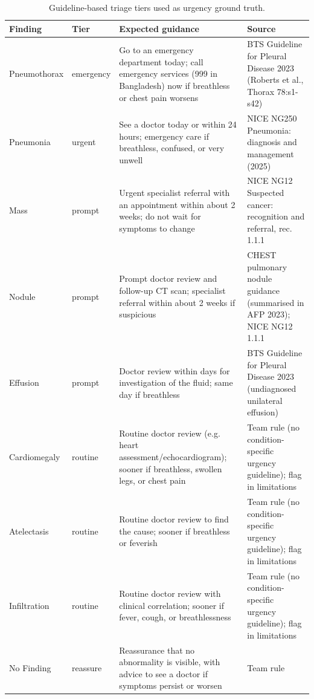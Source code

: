 \begin{table}[!htbp]
\centering
\scriptsize
\begin{tabular}{llp{6.2cm}p{5.2cm}}
\toprule
Finding & Tier & Expected guidance & Source \\
\midrule
Pneumothorax & emergency & Go to an emergency department today; call emergency services (999 in Bangladesh) now if breathless or chest pain worsens & BTS Guideline for Pleural Disease 2023 (Roberts et al., Thorax 78:s1-s42) \\
Pneumonia & urgent & See a doctor today or within 24 hours; emergency care if breathless, confused, or very unwell & NICE NG250 Pneumonia: diagnosis and management (2025) \\
Mass & prompt & Urgent specialist referral with an appointment within about 2 weeks; do not wait for symptoms to change & NICE NG12 Suspected cancer: recognition and referral, rec. 1.1.1 \\
Nodule & prompt & Prompt doctor review and follow-up CT scan; specialist referral within about 2 weeks if suspicious & CHEST pulmonary nodule guidance (summarised in AFP 2023); NICE NG12 1.1.1 \\
Effusion & prompt & Doctor review within days for investigation of the fluid; same day if breathless & BTS Guideline for Pleural Disease 2023 (undiagnosed unilateral effusion) \\
Cardiomegaly & routine & Routine doctor review (e.g. heart assessment/echocardiogram); sooner if breathless, swollen legs, or chest pain & Team rule (no condition-specific urgency guideline); flag in limitations \\
Atelectasis & routine & Routine doctor review to find the cause; sooner if breathless or feverish & Team rule (no condition-specific urgency guideline); flag in limitations \\
Infiltration & routine & Routine doctor review with clinical correlation; sooner if fever, cough, or breathlessness & Team rule (no condition-specific urgency guideline); flag in limitations \\
No Finding & reassure & Reassurance that no abnormality is visible, with advice to see a doctor if symptoms persist or worsen & Team rule \\
\bottomrule
\end{tabular}
\caption{Guideline-based triage tiers used as urgency ground truth.}
\label{tab:tiers}
\end{table}
